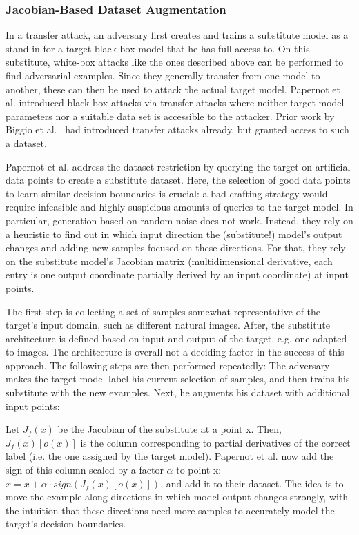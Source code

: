 \documentclass[review]{AIM_report}
\begin{document}


\subsubsection{Jacobian-Based Dataset Augmentation}
In a transfer attack, an adversary first creates and trains a substitute model as a stand-in for a target black-box model that he has full access to. On this substitute, white-box attacks like the ones described above can be performed to find adversarial examples. Since they generally transfer from one model to another, these can then be used to attack the actual target model.
Papernot et al. \cite{papernot2017practical} introduced black-box attacks via transfer attacks where neither target model parameters nor a suitable data set is accessible to the attacker. Prior work by Biggio et al.\ \cite{biggio2013evasion} had introduced transfer attacks already, but granted access to such a dataset.

Papernot et al. address the dataset restriction by querying the target on artificial data points to create a substitute dataset. Here, the selection of good data points to learn similar decision boundaries is crucial: a bad crafting strategy would require infeasible and highly suspicious amounts of queries to the target model. In particular, generation based on random noise does not work.
Instead, they rely on a heuristic to find out in which input direction the (substitute!) model's output changes and adding new samples focused on these directions. For that, they rely on the substitute model's Jacobian matrix (multidimensional derivative, each entry is one output coordinate partially derived by an input coordinate) at input points.

The first step is collecting a set of samples somewhat representative of the target's input domain, such as different natural images. After, the substitute architecture is defined based on input and output of the target, e.g. one adapted to images. The architecture is overall not a deciding factor in the success of this approach.
The following steps are then performed repeatedly: The adversary makes the target model label his current selection of samples, and then trains his substitute with the new examples. Next, he augments his dataset with additional input points:

Let \(J_f(x)\) be the Jacobian of the substitute at a point x. Then, \(J_f(x)[o(x)]\) is the column corresponding to partial derivatives of the correct label (i.e. the one assigned by the target model). Papernot et al. now add the sign of this column scaled by a factor \(\alpha\) to point x: \(x = x + \alpha \cdot sign(J_f(x)[o(x)])\), and add it to their dataset. The idea is to move the example along directions in which model output changes strongly, with the intuition that these directions need more samples to accurately model the target's decision boundaries.
\end{document}
